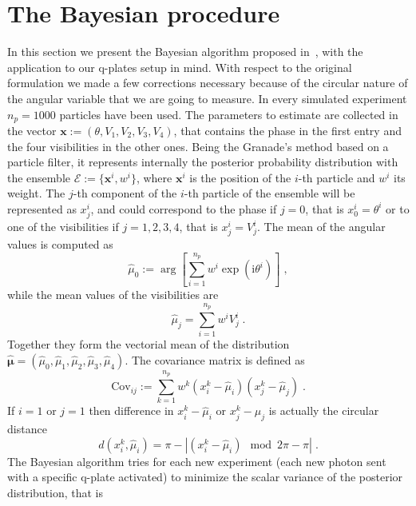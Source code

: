 \documentclass[aps, pra, 10pt, twocolumn, superscriptaddress,floatfix]{revtex4-1}
\newcommand{\mi}{\mathrm{i}} %
\begin{document}
\section{The Bayesian procedure}
%
In this section we present the Bayesian algorithm proposed in~\cite{Granade2012}, with the application to our q-plates setup in mind. With respect to the original formulation we made a few corrections necessary because of the circular nature of the angular variable that we are going to measure. In every simulated experiment $n_p = 1000$ particles have been used. The parameters to estimate are collected in the vector $\boldsymbol{x} := \left( \theta, V_1, V_2, V_3, V_4 \right)$, that contains the phase in the first entry and the four visibilities in the other ones. Being the Granade's method based on a particle filter, it represents internally the posterior probability distribution with the ensemble $\mathcal{E} := \lbrace \boldsymbol{x}^i, w^i \rbrace$, where $\boldsymbol{x}^i$ is the position of the $i$-th particle and $w^i$ its weight. The $j$-th component of the $i$-th particle of the ensemble will be represented as $x_j^i$, and could correspond to the phase if $j=0$, that is $x^i_0 = \theta^i$ or to one of the visibilities if $j=1, 2, 3, 4$, that is $x^i_j = V^i_j$. The mean of the angular values is computed as
%
\begin{equation}
	\hat{\mu}_0 := \arg \left[ \sum_{i=1}^{n_{p}} w^i \exp \left( \mi \theta^i \right) \right] \; ,
\end{equation}
%
while the mean values of the visibilities are
%
\begin{equation}
	\hat{\mu}_j = \sum_{i=1}^{n_p} w^i V^i_j \; .
\end{equation}
%
Together they form the vectorial mean of the distribution $\boldsymbol{\hat{\mu}} = (\hat{\mu}_0, \hat{\mu}_1, \hat{\mu}_2, \hat{\mu}_3, \hat{\mu}_4)$. The covariance matrix is defined as
%
\begin{equation}
	\text{Cov}_{ij} := \sum_{k=1}^{n_{p}} w^k (x^k_i - \hat{\mu}_i)  (x^k_j - \hat{\mu}_j) \; .
\end{equation}
%
If $i=1$ or $j=1$ then difference in $x^k_i - \hat{\mu}_i$ or $x^k_j - \hat{\mu}_j$ is actually the circular distance
%
\begin{equation}
	d(x^k_i, \hat{\mu}_i) = \pi - | (x^k_i - \hat{\mu}_i) \mod 2 \pi - \pi| \; .
\end{equation}
%
The Bayesian algorithm tries for each new experiment (each new photon sent with a specific q-plate activated) to minimize the scalar variance of the posterior distribution, that is
\end{document}
